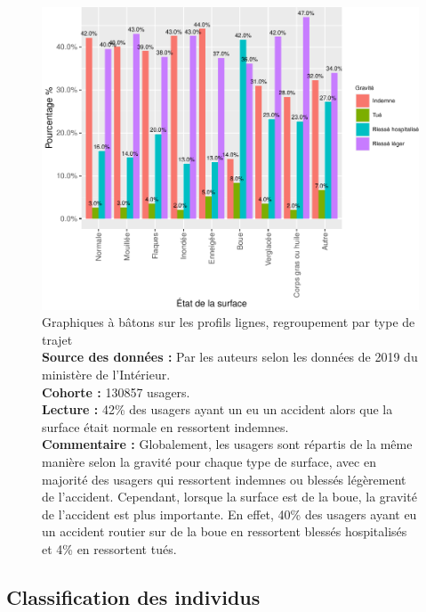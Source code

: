 \documentclass[french,]{tp}
\begin{document}
\begin{figure}[ht!]

{\centering \includegraphics{Prediction_Gravite_files/figure-latex/barplotsurface-1} 

}

\caption{Graphiques à bâtons sur les profils lignes, regroupement par type de trajet\\
\textbf{Source des données :} Par les auteurs selon les données de 2019 du ministère de l'Intérieur.\\
\textbf{Cohorte :} 130857 usagers.\\
\textbf{Lecture :} 42\% des usagers ayant un eu un accident alors que la surface était normale en ressortent indemnes.\\
\textbf{Commentaire :} Globalement, les usagers sont répartis de la même manière selon la gravité pour chaque type de surface, avec en majorité des usagers qui ressortent indemnes ou blessés légèrement de l'accident. Cependant, lorsque la surface est de la boue, la gravité de l'accident est plus importante. En effet, 40\% des usagers ayant eu un accident routier sur de la boue en ressortent blessés hospitalisés et 4\% en ressortent tués.}\label{fig:barplotsurface}
\end{figure}

\newpage

\hypertarget{classification-des-individus}{%
\subsection{Classification des individus}\label{classification-des-individus}}
\end{document}
